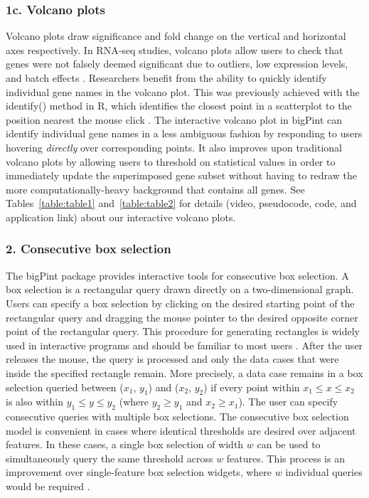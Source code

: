 \documentclass[parskip=full]{bmcart} %
\begin{document}
\subsubsection*{1c. Volcano plots}

Volcano plots draw significance and fold change on the vertical and horizontal axes respectively. In RNA-seq studies, volcano plots allow users to check that genes were not falsely deemed significant due to outliers, low expression levels, and batch effects \cite{li2011application}. Researchers benefit from the ability to quickly identify individual gene names in the volcano plot. This was previously achieved with the identify() method in R, which identifies the closest point in a scatterplot to the position nearest the mouse click \cite{li2011application}. The interactive volcano plot in bigPint can identify individual gene names in a less ambiguous fashion by responding to users hovering \textit{directly} over corresponding points. It also improves upon traditional volcano plots by allowing users to threshold on statistical values in order to immediately update the superimposed gene subset without having to redraw the more computationally-heavy background that contains all genes. See Tables~\ref{table:table1} and~\ref{table:table2} for details (video, pseudocode, code, and application link) about our interactive volcano plots.

\subsubsection*{2. Consecutive box selection}

The bigPint package provides interactive tools for consecutive box selection. A box selection is a rectangular query drawn directly on a two-dimensional graph. Users can specify a box selection by clicking on the desired starting point of the rectangular query and dragging the mouse pointer to the desired opposite corner point of the rectangular query. This procedure for generating rectangles is widely used in interactive programs and should be familiar to most users \cite{hochheiser2003dynamic}. After the user releases the mouse, the query is processed and only the data cases that were inside the specified rectangle remain. More precisely, a data case remains in a box selection queried between ($x_1$, $y_1$) and ($x_2$, $y_2$) if every point within $x_1 \leq x \leq x_2$ is also within $y_1 \leq y \leq y_2$ (where $y_2 \geq y_1$ and $x_2 \geq x_1$). The user can specify consecutive queries with multiple box selections. The consecutive box selection model is convenient in cases where identical thresholds are desired over adjacent features. In these cases, a single box selection of width $w$ can be used to simultaneously query the same threshold across $w$ features. This process is an improvement over single-feature box selection widgets, where $w$ individual queries would be required \cite{hochheiser2003dynamic}. 
\end{document}
